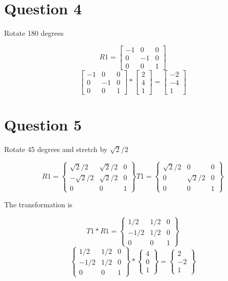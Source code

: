 \documentclass{article}
\begin{document}
	\section{Question 4}
	\begin{center}
		Rotate 180 degrees
	\end{center}
	\[
		R1 = 
		\begin{bmatrix}
		-1 & 0 & 0 \\
		0 & -1 & 0 \\
		0 & 0 & 1
		\end{bmatrix}
	\]
	\[
		\begin{bmatrix}
		-1 & 0 & 0 \\
		0 & -1 & 0 \\
		0 & 0 & 1
		\end{bmatrix}
		*
		\begin{bmatrix}
		2 \\
		4 \\ 
		1
		\end{bmatrix}
		=
		\begin{bmatrix}
		-2 \\
		-4 \\ 
		1
		\end{bmatrix}
	\]
	
	\section{Question 5}
	\begin{center}
		Rotate 45 degrees and stretch by $\sqrt{2}/2$
	\end{center}
	\[
		R1 = 
		\begin{Bmatrix}
			\sqrt{2}/2 & \sqrt{2}/2 & 0 \\
			-\sqrt{2}/2 & \sqrt{2}/2 & 0 \\
			0 & 0 & 1
		\end{Bmatrix}
		T1 = 
		\begin{Bmatrix}
			\sqrt{2}/2 & 0 & 0 \\
			0 & \sqrt{2}/2 & 0 \\
			0 & 0 & 1
		\end{Bmatrix}
	\]
	\begin{center}
		The transformation is
	\end{center}
	\[
		T1 * R1 = 
		\begin{Bmatrix}
			1/2 & 1/2 & 0 \\
			-1/2 & 1/2 & 0 \\
			0 & 0 & 1
		\end{Bmatrix}
	\]
	\[
		\begin{Bmatrix}
		1/2 & 1/2 & 0 \\
		-1/2 & 1/2 & 0 \\
		0 & 0 & 1
		\end{Bmatrix}
		*
		\begin{Bmatrix}
		4 \\ 
		0 \\
		1
		\end{Bmatrix}
		=
		\begin{Bmatrix}
		2 \\
		-2 \\
		1
		\end{Bmatrix}
	\]
	
\end{document}
